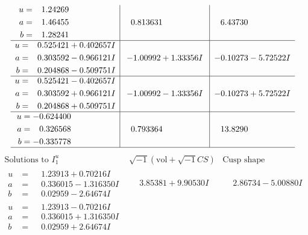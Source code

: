\documentclass[1p]{elsarticle_modified}
\theoremstyle{definition}
\newcommand{\I}{\sqrt{-1}}
\begin{document}
$$\begin{array}{c|c|c}
\begin{aligned}
u &= \phantom{-}1.24269\phantom{ +0.000000I} \\
a &= \phantom{-}1.46455\phantom{ +0.000000I} \\
b &= \phantom{-}1.28241\phantom{ +0.000000I}\end{aligned}
 & \phantom{-}0.813631\phantom{ +0.000000I} & \phantom{-}6.43730\phantom{ +0.000000I} \\ \hline\begin{aligned}
u &= \phantom{-}0.525421 + 0.402657 I \\
a &= \phantom{-}0.303592 - 0.966121 I \\
b &= \phantom{-}0.204868 - 0.509751 I\end{aligned}
 & -1.00992 + 1.33356 I & -0.10273 - 5.72522 I \\ \hline\begin{aligned}
u &= \phantom{-}0.525421 - 0.402657 I \\
a &= \phantom{-}0.303592 + 0.966121 I \\
b &= \phantom{-}0.204868 + 0.509751 I\end{aligned}
 & -1.00992 - 1.33356 I & -0.10273 + 5.72522 I \\ \hline\begin{aligned}
u &= -0.624400\phantom{ +0.000000I} \\
a &= \phantom{-}0.326568\phantom{ +0.000000I} \\
b &= -0.335778\phantom{ +0.000000I}\end{aligned}
 & \phantom{-}0.793364\phantom{ +0.000000I} & \phantom{-}13.8290\phantom{ +0.000000I}\\
 \hline 
 \end{array}$$\newpage$$\begin{array}{c|c|c}  
\text{Solutions to }I^u_{1}& \I (\text{vol} + \sqrt{-1}CS) & \text{Cusp shape}\\
 \hline 
\begin{aligned}
u &= \phantom{-}1.23913 + 0.70216 I \\
a &= \phantom{-}0.336015 - 1.316350 I \\
b &= \phantom{-}0.02959 - 2.64674 I\end{aligned}
 & \phantom{-}3.85381 + 9.90530 I & \phantom{-}2.86734 - 5.00880 I \\ \hline\begin{aligned}
u &= \phantom{-}1.23913 - 0.70216 I \\
a &= \phantom{-}0.336015 + 1.316350 I \\
b &= \phantom{-}0.02959 + 2.64674 I\end{aligned}

\end{array}$$
\end{document}
